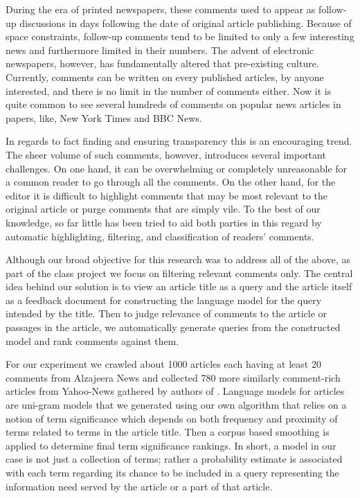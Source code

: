 \documentclass[article]{IEEEtran}
\begin{document}
During the era of printed newspapers, these comments used to appear as follow-up  discussions in days following the date of original article publishing. Because of space constraints, follow-up comments tend to be limited to only a few interesting news and furthermore limited in their numbers. The advent of electronic newspapers, however, has fundamentally altered that pre-existing culture. Currently, comments can be written on every published articles, by anyone interested,  and there is no limit in the number of comments either. Now it is quite common to see several hundreds of comments on popular news articles in papers, like, New York Times and BBC News.

In regards to fact finding and ensuring transparency this is an encouraging trend. The sheer volume of such comments, however, introduces several important  challenges. On one hand, it can be overwhelming or completely unreasonable for a common reader to go through all the comments. On the other hand, for the editor it is difficult to highlight comments that may be most relevant to the  original article or purge comments that are simply vile. To the best of our  knowledge, so far little has been tried to aid both parties in this regard by automatic highlighting, filtering, and classification of readers' comments.

Although our broad objective for this research was to address all of the above, as part of the class project we focus on filtering relevant comments only. The central idea behind our solution is to view an article title as a query and the article itself as a feedback document for constructing the language model for the query intended by the title. Then to judge relevance of comments to the article or passages in the article, we automatically generate queries from the constructed model and rank comments against them.       

For our experiment we crawled about 1000 articles each having at least 20 comments from Alzajeera News and collected 780 more similarly comment-rich articles from Yahoo-News gathered by authors of \cite{Das:2014:GBC:2556195.2556231}. Language models for articles are uni-gram models that we generated using our own algorithm that relies on a notion of term significance which depends on both frequency and proximity of terms related to terms in the article title. Then a corpus based smoothing is applied to determine final term significance rankings. In short, a model in our case is not just a collection of terms; rather a probability estimate is associated with each term regarding its chance to be included in a query representing the information need served by the article or a part of that article. 
\end{document}
